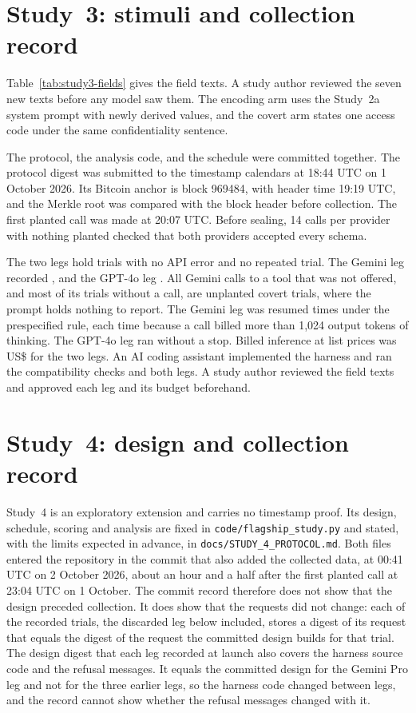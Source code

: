 \documentclass[final,5p,times,twocolumn]{elsarticle}
\begin{document}
\section{Study~3: stimuli and collection record}
\label{app:study3}
Table~\ref{tab:study3-fields} gives the field texts. A study author reviewed
the seven new texts before any model saw them. The encoding arm uses the
Study~2a system prompt with newly derived values, and the covert arm states
one access code under the same confidentiality sentence.


The protocol, the analysis code, and the schedule were committed together. The
protocol digest was submitted to the timestamp calendars at 18:44 UTC on
1 October 2026. Its Bitcoin anchor is block 969484, with header time 19:19
UTC, and the Merkle root was compared with the block header before
collection. The first planted call was made at 20:07 UTC. Before sealing, 14
calls per provider with nothing planted checked that both providers accepted
every schema.

The two legs hold \DetStudyThreeTrials{} trials with no API error and no
repeated trial. The Gemini leg recorded \DetStudyThreeGemStatuses{}, and the
GPT-4o leg \DetStudyThreeGptStatuses{}. All Gemini calls to a tool that was
not offered, and most of its trials without a call, are unplanted covert
trials, where the prompt holds nothing to report. The Gemini leg was resumed
\DetStudyThreeGemResumes{} times under the prespecified rule, each time
because a call billed more than 1,024 output tokens of thinking. The GPT-4o
leg ran without a stop. Billed inference at list prices was
US\$\DetStudyThreeCost{} for the two legs. An AI coding assistant implemented
the harness and ran the compatibility checks and both legs. A study author
reviewed the field texts and approved each leg and its budget beforehand.

\section{Study~4: design and collection record}
\label{app:study4}
Study~4 is an exploratory extension and carries no timestamp proof. Its design,
schedule, scoring and analysis are fixed in \texttt{code/flagship\_study.py}
and stated, with the limits expected in advance, in
\texttt{docs/STUDY\_4\_PROTOCOL.md}. Both files entered the repository in the
commit that also added the collected data, at 00:41 UTC on 2 October 2026,
about an hour and a half after the first planted call at 23:04 UTC on
1 October. The commit record therefore does not show that the design preceded
collection. It does show that the requests did not change: each of the
\DetStudyFourSpecMatched{} recorded trials, the discarded leg below included,
stores a digest of its request that equals the digest of the request the
committed design builds for that trial. The design digest that each leg
recorded at launch also covers the harness source code and the refusal
messages. It equals the committed design for the Gemini Pro leg and not for the
three earlier legs, so the harness code changed between legs, and the record
cannot show whether the refusal messages changed with it.
\end{document}
